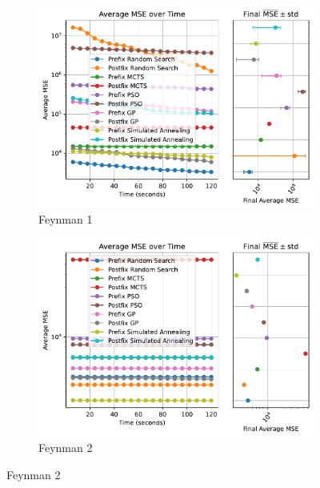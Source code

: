 \documentclass[runningheads]{llncs}
\begin{document}
\begin{figure}
    \centering
    
    \begin{subfigure}[b]{0.49\textwidth}
        \includegraphics[width=\linewidth, keepaspectratio]{AIFeynman_Benchmarks/Feynman_Benchmark_1.pdf}
        \caption{Feynman 1}
        \label{subfig:feynman_1}
    \end{subfigure}
    \begin{subfigure}[b]{0.49\textwidth}
        \includegraphics[width=\linewidth, keepaspectratio]{AIFeynman_Benchmarks/Feynman_Benchmark_2.pdf}
        \caption{Feynman 2}
        \label{subfig:feynman_2}
    \end{subfigure}
    
    \vspace{0.5cm}
    

\end{figure}
\end{document}
